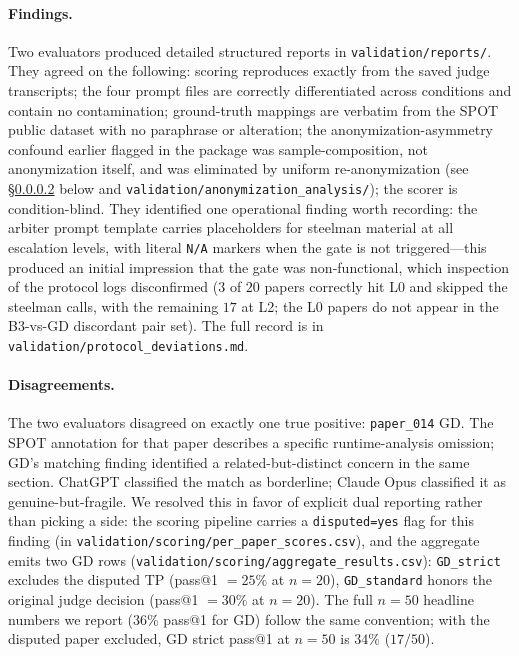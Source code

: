 \documentclass[11pt]{article}
\theoremstyle{definition}
\begin{document}
\paragraph{Findings.} Two evaluators produced detailed structured reports in \texttt{validation/reports/}. They agreed on the following: scoring reproduces exactly from the saved judge transcripts; the four prompt files are correctly differentiated across conditions and contain no contamination; ground-truth mappings are verbatim from the SPOT public dataset with no paraphrase or alteration; the anonymization-asymmetry confound earlier flagged in the package was sample-composition, not anonymization itself, and was eliminated by uniform re-anonymization (see \S\ref{sec:results:audit:disputed} below and \texttt{validation/anonymization\_analysis/}); the scorer is condition-blind. They identified one operational finding worth recording: the arbiter prompt template carries placeholders for steelman material at all escalation levels, with literal \texttt{N/A} markers when the gate is not triggered---this produced an initial impression that the gate was non-functional, which inspection of the protocol logs disconfirmed ($3$ of $20$ papers correctly hit L0 and skipped the steelman calls, with the remaining $17$ at L2; the L0 papers do not appear in the B3-vs-GD discordant pair set). The full record is in \texttt{validation/protocol\_deviations.md}.

\paragraph{Disagreements.}
\label{sec:results:audit:disputed}
The two evaluators disagreed on exactly one true positive: \texttt{paper\_014} GD. The SPOT annotation for that paper describes a specific runtime-analysis omission; GD's matching finding identified a related-but-distinct concern in the same section. ChatGPT classified the match as borderline; Claude Opus classified it as genuine-but-fragile. We resolved this in favor of explicit dual reporting rather than picking a side: the scoring pipeline carries a \texttt{disputed=yes} flag for this finding (in \texttt{validation/scoring/per\_paper\_scores.csv}), and the aggregate emits two GD rows (\texttt{validation/scoring/aggregate\_results.csv}): \texttt{GD\_strict} excludes the disputed TP (pass@1 $= 25\%$ at $n = 20$), \texttt{GD\_standard} honors the original judge decision (pass@1 $= 30\%$ at $n = 20$). The full $n = 50$ headline numbers we report ($36\%$ pass@1 for GD) follow the same convention; with the disputed paper excluded, GD strict pass@1 at $n = 50$ is $34\%$ ($17/50$).
\end{document}
